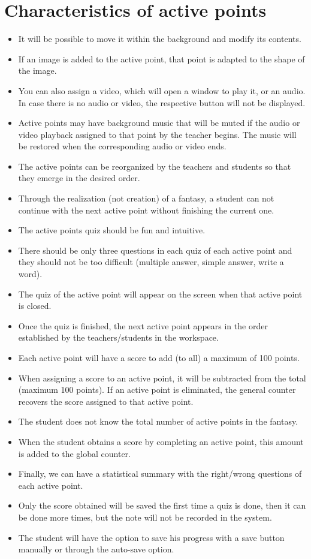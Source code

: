 \section{Characteristics of active points}
\begin{itemize}
	\item It will be possible to move it within the background and modify its contents.
	\item If an image is added to the active point, that point is adapted to the shape of the image.
	\item You can also assign a video, which will open a window to play it, or an audio. In case there is no audio or video, the respective button will not be displayed.
	\item Active points may have background music that will be muted if the audio or video playback assigned to that point by the teacher begins. The music will be restored when the corresponding audio or video ends.
	\item The active points can be reorganized by the teachers and students so that they emerge in the desired order.
	\item Through the realization (not creation) of a fantasy, a student can not continue with the next active point without finishing the current one.
	\item The active points quiz should be fun and intuitive.
	\item There should be only three questions in each quiz of each active point and they should not be too difficult (multiple answer, simple answer, write a word).
	\item The quiz of the active point will appear on the screen when that active point is closed.
	\item Once the quiz is finished, the next active point appears in the order established by the teachers/students in the workspace.
	\item Each active point will have a score to add (to all) a maximum of 100 points.
	\item When assigning a score to an active point, it will be subtracted from the total (maximum 100 points). If an active point is eliminated, the general counter recovers the score assigned to that active point.
	\item The student does not know the total number of active points in the fantasy.
	\item When the student obtains a score by completing an active point, this amount is added to the global counter.
	\item Finally, we can have a statistical summary with the right/wrong questions of each active point.
	\item Only the score obtained will be saved the first time a quiz is done, then it can be done more times, but the note will not be recorded in the system.
	\item The student will have the option to save his progress with a save button manually or through the auto-save option.
\end{itemize}